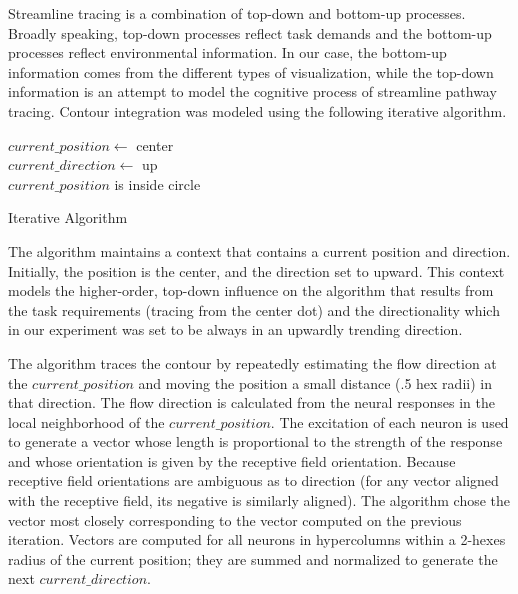 Streamline tracing is a combination of top-down and bottom-up
processes. Broadly speaking, top-down processes reflect task demands
and the bottom-up processes reflect environmental information. In our
case, the bottom-up information comes from the different types of
visualization, while the top-down information is an attempt to model
the cognitive process of streamline pathway tracing. Contour
integration was modeled using the following iterative algorithm.

\medskip
\begin{algorithm}[H]
\SetAlgoNoLine
$current\_position \leftarrow$ center \\
$current\_direction \leftarrow$ up \\
$current\_position$ is inside circle \\
    \caption{Iterative Algorithm}
    \label{alg:one}
  \end{algorithm}
\medskip

The algorithm maintains a context that contains a current position
and direction. Initially, the position is the center, and the
direction set to upward. This context models the higher-order,
top-down influence on the algorithm that results from the task
requirements (tracing from the center dot) and the directionality
which in our experiment was set to be always in an upwardly trending direction.

The algorithm traces the contour by repeatedly estimating the flow
direction at the $current\_position$ and moving the position a small
distance (.5 hex radii) in that direction. The flow direction is
calculated from the neural responses in the local neighborhood of the
$current\_position$. The excitation of each neuron is used to
generate a vector whose length is proportional to the strength of the
response and whose orientation is given by the receptive field
orientation. Because receptive field orientations are ambiguous as to
direction (for any vector aligned with the receptive field, its
negative is similarly aligned). The algorithm chose the vector most
closely corresponding to the vector computed on the previous
iteration. Vectors are computed for all neurons in hypercolumns
within a 2-hexes radius of the current position; they are summed and
normalized to generate the next $current\_direction$.


